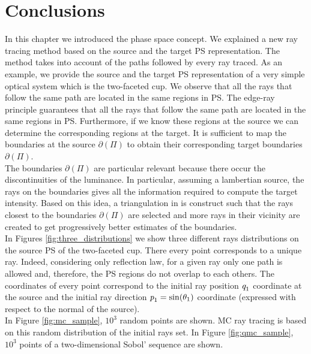 \section{Conclusions}
In this chapter we introduced the phase space concept. 
We explained a new ray tracing method based on the source and the target PS representation.
The method takes into account of the paths followed by every ray traced.
As an example, we provide the source and the target PS representation of a very simple optical system which is the two-faceted cup.
We observe that all the rays that follow the same path are located in the same regions in PS.
The edge-ray principle guarantees that all the rays that follow the same path are located in the same regions in PS. Furthermore, 
if we know these regions at the source we can determine the corresponding regions at the target. 
It is sufficient to map the boundaries at the source $\partial$$(\Pi)$ to obtain their corresponding target boundaries $\partial$$(\Pi)$. \\ \indent
The boundaries $\partial$$(\Pi)$ are particular relevant because there occur the discontinuities of the luminance. In particular, 
assuming a lambertian source, the rays on the boundaries gives all the information required to compute the target intensity. Based on this idea, a triangulation in  is construct such that the rays closest to the boundaries $\partial$$(\Pi)$
are selected and more rays in their vicinity are created to get progressively better estimates of the boundaries.
\\ \indent In Figures \ref{fig:three_distributions} we show three different rays distributions on the source PS of the two-faceted cup. There every point corresponds to a unique ray.
Indeed, considering only reflection law, for a given ray only one path is allowed and, therefore, the PS regions do not overlap to each others. 
The coordinates of every point correspond to the initial ray position $\textit{q}_1$ coordinate at the source and the initial ray direction $\textit{p}_1 = \sin(\theta_1)$ 
coordinate (expressed with respect to the normal of the source). \\ \indent In Figure \ref{fig:mc_sample}, $10^3$ random points are shown. MC ray tracing is based on this random distribution of the initial rays set. In Figure \ref{fig:qmc_sample}, $10^3$ points of a two-dimensional Sobol' sequence are shown. 
